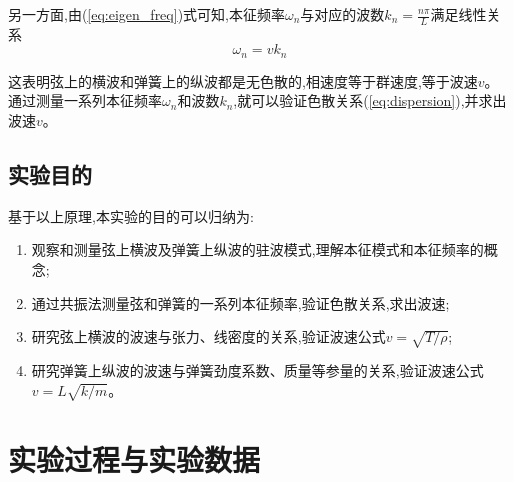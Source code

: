 \documentclass[UTF8]{ctexart}
\begin{document}
另一方面,由(\ref{eq:eigen_freq})式可知,本征频率$\omega_n$与对应的波数$k_n=\frac{n\pi}{L}$满足线性关系
\begin{equation}
\omega_n = vk_n
\label{eq:dispersion}
\end{equation}

这表明弦上的横波和弹簧上的纵波都是无色散的,相速度等于群速度,等于波速$v$。通过测量一系列本征频率$\omega_n$和波数$k_n$,就可以验证色散关系(\ref{eq:dispersion}),并求出波速$v$。

\subsection{实验目的}

基于以上原理,本实验的目的可以归纳为:
\begin{enumerate}
\item 观察和测量弦上横波及弹簧上纵波的驻波模式,理解本征模式和本征频率的概念;
\item 通过共振法测量弦和弹簧的一系列本征频率,验证色散关系,求出波速;
\item 研究弦上横波的波速与张力、线密度的关系,验证波速公式$v=\sqrt{T/\rho}$;
\item 研究弹簧上纵波的波速与弹簧劲度系数、质量等参量的关系,验证波速公式$v=L\sqrt{k/m}$。
\end{enumerate}

\section{实验过程与实验数据}
\end{document}
